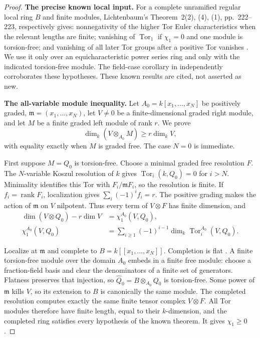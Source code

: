 \begin{proof}
\par\smallskip\noindent\textbf{The precise known local input.}\quad
For a complete unramified regular local ring \(B\)
and finite modules, Lichtenbaum's
Theorem~2(2), (4), (1), pp.~222--223, respectively gives:
nonnegativity of the higher Tor Euler characteristics
when the relevant lengths are finite;
vanishing of \(\operatorname{Tor}_1\) if
\(\chi_1=0\) and one module is torsion-free;
and vanishing of all later Tor groups after a
positive Tor vanishes \cite{LichtenbaumTor}.
We use it only over an equicharacteristic power
series ring and only with the indicated torsion-free
module. The field-case corollary in
\cite[supplementary lecture April~18, p.~169]{Hochster615}
independently corroborates these hypotheses.
These known results are cited, not asserted as new.

\par\smallskip\noindent\textbf{The all-variable module inequality.}\quad
Let \(A_0=k[x_1,\ldots,x_N]\) be positively graded,
\(\mathfrak m=(x_1,\ldots,x_N)\), let \(V\ne0\) be
a finite-dimensional graded right module, and let
\(M\) be a finite graded left module of rank \(r\).
We prove
\begin{equation}\label{eq:allRankTensorDimension}
 \dim_k(V\otimes_{A_0}M)\ge r\dim_kV,
\end{equation}
with equality exactly when \(M\) is graded free.
The case \(N=0\) is immediate.

First suppose \(M=Q_0\) is torsion-free.
Choose a minimal graded free resolution \(F\).
The \(N\)-variable Koszul resolution of \(k\) gives
\(\operatorname{Tor}_i(k,Q_0)=0\) for \(i>N\).
Minimality identifies this Tor with
\(F_i/\mathfrak mF_i\), so the resolution is finite.
If \(f_i=\operatorname{rank}F_i\), localization
gives \(\sum_i(-1)^if_i=r\).
The positive grading makes the action of
\(\mathfrak m\) on \(V\) nilpotent. Thus every
term of \(V\otimes F\) has finite dimension, and
\begin{equation}\label{eq:allRankChiOne}
 \begin{split}
 \dim(V\otimes Q_0)-r\dim V
 &=\chi_1^{A_0}(V,Q_0),\\
 \chi_1^{A_0}(V,Q_0)
 &=\sum_{i\ge1}(-1)^{i-1}
               \dim_k\operatorname{Tor}_i^{A_0}(V,Q_0).
 \end{split}
\end{equation}

Localize at \(\mathfrak m\) and complete to
\(B=k[[x_1,\ldots,x_N]]\). Completion is flat
\cite[Lemmas~10.97.2--10.97.3, tags 00MB--00MC]{StacksCompletion}.
A finite torsion-free module over the domain \(A_0\)
embeds in a finite free module: choose a fraction-field
basis and clear the denominators of a finite set of
generators. Flatness preserves that injection, so
\(\widehat Q_0=B\otimes_{A_0}Q_0\) is torsion-free.
Some power of \(\mathfrak m\) kills \(V\), so its
extension to \(B\) is canonically the same module.
The completed resolution computes exactly the
same finite tensor complex \(V\otimes F\).
All Tor modules therefore have finite length, equal
to their \(k\)-dimension, and the completed ring
satisfies every hypothesis of the known theorem.
It gives \(\chi_1\ge0\).


\end{proof}
